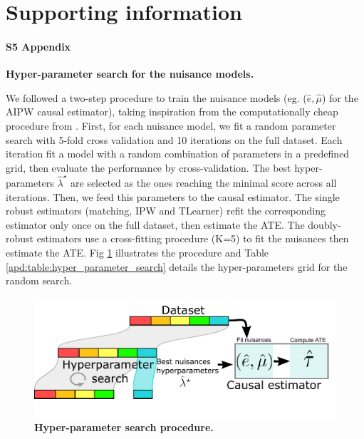 \documentclass[10pt,letterpaper]{article}
\begin{document}
\vspace*{0.2in}

\section*{Supporting information}


\paragraph*{S5 Appendix}
\label{apd:hyper_parameter_search}
{\bf Hyper-parameter search for the nuisance models.}

We followed a two-step procedure to train the nuisance models (eg. ($\hat e,
    \hat \mu$) for the AIPW causal estimator), taking inspiration from the
computationally cheap procedure from
\cite[section~3.3]{bouthillier2021accounting}. First, for each nuisance
model, we fit a random parameter search with 5-fold cross validation and 10
iterations on the full dataset. Each iteration fit a model with a random
combination of parameters in a predefined grid, then evaluate the
performance by cross-validation. The best hyper-parameters $\hat
    \lambda^{\star}$ are selected as the ones reaching the minimal score across
all iterations. Then, we feed this parameters to the causal estimator. The
single robust estimators (matching, IPW and TLearner) refit the
corresponding estimator only once on the full dataset, then estimate the
ATE. The doubly-robust estimators use a cross-fitting procedure (K=5) to fit
the nuisances then estimate the ATE. Fig
\ref{apd:fig:hyper_parameter_search} illustrates the procedure and Table
\ref{apd:table:hyper_parameter_search} details the hyper-parameters grid for
the random search.

\begin{figure}[!h]
    \begin{minipage}{.38\linewidth}
        \caption{{\bf Hyper-parameter search procedure.}}\label{apd:fig:hyper_parameter_search}
    \end{minipage}%
    \hfill
    \begin{minipage}{.6\linewidth}
        \includegraphics[width=\linewidth]{img_supp_final/hp_search_procedure.pdf}
    \end{minipage}%
\end{figure}
\end{document}
